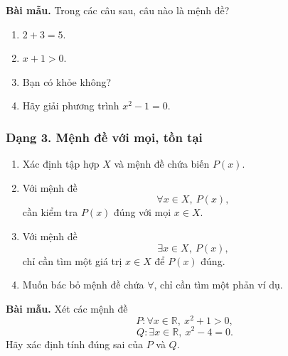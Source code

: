 \begin{vidumau}

\textbf{Bài mẫu.} Trong các câu sau, câu nào là mệnh đề?
\begin{enumerate}
	\item $2+3=5$.
	\item $x+1>0$.
	\item Bạn có khỏe không?
	\item Hãy giải phương trình $x^2-1=0$.
\end{enumerate}


\end{vidumau}


\subsubsection{Dạng 3. Mệnh đề với mọi, tồn tại}

\begin{phuongphap}
\begin{enumerate}
	\item Xác định tập hợp $X$ và mệnh đề chứa biến $P(x)$.
	\item Với mệnh đề
	\[
	\forall x\in X,\ P(x),
	\]
	cần kiểm tra $P(x)$ đúng với mọi $x\in X$.
	\item Với mệnh đề
	\[
	\exists x\in X,\ P(x),
	\]
	chỉ cần tìm một giá trị $x\in X$ để $P(x)$ đúng.
	\item Muốn bác bỏ mệnh đề chứa $\forall$, chỉ cần tìm một phản ví dụ.
\end{enumerate}
\end{phuongphap}

\begin{vidumau}

\textbf{Bài mẫu.} Xét các mệnh đề
\[
P\colon \forall x\in\mathbb{R},\ x^2+1>0,
\]
\[
Q\colon \exists x\in\mathbb{R},\ x^2-4=0.
\]
Hãy xác định tính đúng sai của $P$ và $Q$.

\end{vidumau}


